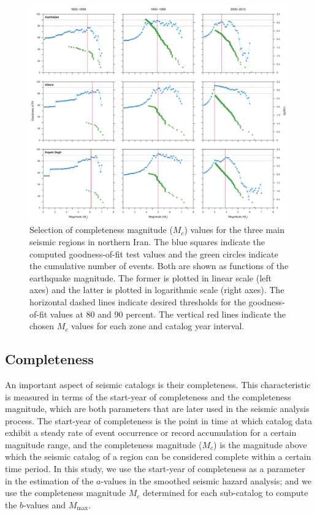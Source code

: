 \begin{figure}[t]
    \centering
    \includegraphics[width=\textwidth]{figures/pdf/figure-06.pdf}
    \caption{Selection of completeness magnitude ($M_c$) values for the three main seismic regions in northern Iran. The blue squares indicate the computed goodness-of-fit test values and the green circles indicate the cumulative number of events. Both are shown as functions of the earthquake magnitude. The former is plotted in linear scale (left axes) and the latter is plotted in logarithmic scale (right axes). The horizontal dashed lines indicate desired thresholds for the goodness-of-fit values at 80 and 90 percent. The vertical red lines indicate the chosen $M_c$ values for each zone and catalog year interval.}
    \label{fig:mc}
\end{figure}

\subsection{Completeness}

An important aspect of seismic catalogs is their completeness. This characteristic is measured in terms of the start-year of completeness and the completeness magnitude, which are both parameters that are later used in the seismic analysis process. The start-year of completeness is the point in time at which catalog data exhibit a steady rate of event occurrence or record accumulation for a certain magnitude range, and the completeness magnitude ($M_c$) is the magnitude above which the seismic catalog of a region can be considered complete within a certain time period. In this study, we use the start-year of completeness as a parameter in the estimation of the $a$-values in the smoothed seismic hazard analysis; and we use the completeness magnitude $M_c$ determined for each sub-catalog to compute the $b$-values and $M_{\max}$.

